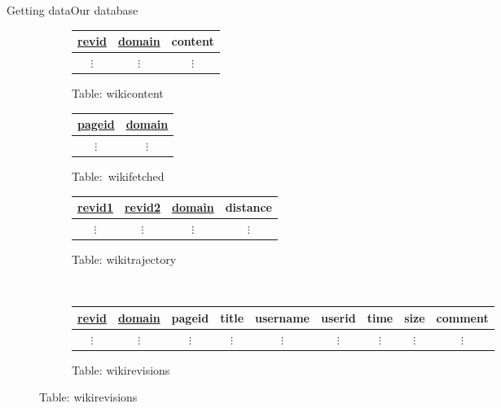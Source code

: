 \documentclass[t]{beamer}
\begin{document}

\begin{frame}[fragile]{Getting data}{Our database}
\begin{figure}[b]
 \tiny
 \centering
 \begin{subfigure}[t]{0.3\linewidth}
   \centering
   \begin{tabular}{ccc}
     \toprule
     \underline{revid} & \underline{domain} & content\\
     \midrule
     $\vdots$ & $\vdots$ & $\vdots$\\
   \end{tabular}
   \caption{\tiny Table: wikicontent}
 \end{subfigure}
 \hspace{2mm}
 \begin{subfigure}[t]{0.2\linewidth}
   \centering
   \begin{tabular}{cc}
     \toprule
     \underline{pageid} & \underline{domain} \\
     \midrule
     $\vdots$ & $\vdots$\\
   \end{tabular}
   \caption{\tiny Table:~wikifetched}
 \end{subfigure}
 \hspace{2mm}
 \begin{subfigure}[t]{0.4\linewidth}
   \centering
   \begin{tabular}{cccc}
     \toprule
     \underline{revid1} & \underline{revid2} & \underline{domain} & distance\\
     \midrule
     $\vdots$ & $\vdots$ & $\vdots$ & $\vdots$ \\
   \end{tabular}
   \caption{\tiny Table: wikitrajectory}
 \end{subfigure}\\
 \vspace{2mm}
 \begin{subfigure}[b!]{\linewidth}
   \centering
   \begin{tabular}{ccccccccc}
     \toprule
     \underline{revid} & \underline{domain} & pageid & title & username & userid & time & size &
     comment \\ 
     \midrule
     $\vdots$ & $\vdots$ & $\vdots$ & $\vdots$ & $\vdots$ & $\vdots$ & $\vdots$
     & $\vdots$ & $\vdots$ \\
   \end{tabular}
   \caption{\tiny Table: wikirevisions}

\end{subfigure}
\end{figure}
\end{frame}
\end{document}
